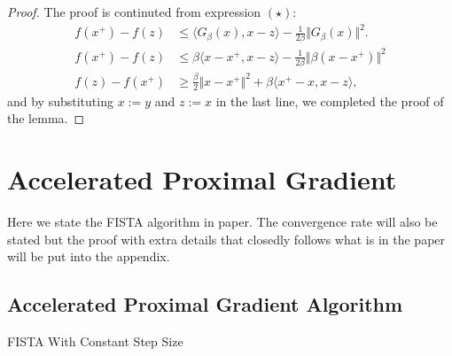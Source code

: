 \documentclass[]{article}
\theoremstyle{definition}
\begin{document}
        \begin{proof}
            The proof is continuted from expression $(\star)$: 
            \begin{align*}
                f(x^+) - f(z) 
                &\le 
                \langle G_\beta(x), x - z\rangle - \frac{1}{2\beta}\Vert G_\beta(x)\Vert^2. 
                \\
                f(x^+) - f(z) & \le 
                \beta\langle x - x^+, x - z\rangle - \frac{1}{2\beta}\Vert \beta (x - x^+)\Vert^2
                \\
                f(z) - f(x^+) & \ge
                \frac{\beta}{2}\Vert x - x^+\Vert^2
                 + 
                \beta\langle x^+ - x, x - z\rangle, 
            \end{align*}
            and by substituting $x :=y$ and $z := x$ in the last line, we completed the proof of the lemma. 
        \end{proof}
\section{Accelerated Proximal Gradient}
    Here we state the FISTA algorithm in paper\cite{paper:FISTA}. The convergence rate will also be stated but the proof with extra details that closedly follows what is in the paper will be put into the appendix. 
    \subsection{Accelerated Proximal Gradient Algorithm} 
        \begin{algorithm}\label{alg:FISTA_1}
        \begin{algorithmic}[1]
                \ENDIF
            \ENDFOR
        \end{algorithmic}\caption{FISTA With Constant Step Size}
        \end{algorithm}
\end{document}
